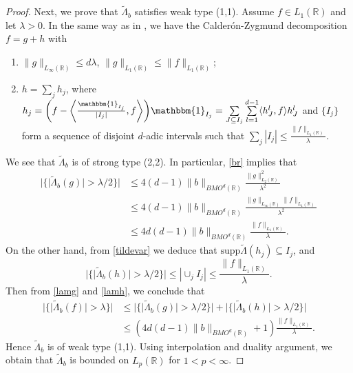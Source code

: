 \documentclass[oneside,english,a4wide]{amsart}
\numberwithin{equation}{section}
\numberwithin{figure}{section}
\theoremstyle{plain}
\theoremstyle{plain}
\theoremstyle{definition}
\theoremstyle{plain}
\theoremstyle{remark}
\theoremstyle{definition}
\theoremstyle{remark}
\theoremstyle{definition}
\newcommand{\8}{\infty}
\begin{document}
\begin{proof}
	Next, we prove that $\tilde{\varLambda}_b$ satisfies weak type (1,1). Assume $f\in L_1(\mathbb{R})$ and let $\lambda>0$. In the same way as in \cite[Lemma 2.7]{Per}, we have the Calder\'{o}n-Zygmund decomposition $f=g+h$ with
	\begin{enumerate}
		\item $\|g\|_{L_\infty(\mathbb{R})}\le d\lambda$, $\|g\|_{L_1(\mathbb{R})}\le \|f\|_{L_1(\mathbb{R})}$;
		\item $h=\sum\limits_{j}h_j$, where $h_j=\bigg(f-\biggl\langle \frac{\mathbbm{1}_{I_j}}{|I_j|},f\biggr\rangle\bigg)\mathbbm{1}_{I_j}=\sum\limits_{J\subseteq I_j}\sum\limits_{l=1}^{d-1}\langle h_J^l,f\rangle h_J^l$ and $\{I_j\}$ form a sequence of disjoint $d$-adic intervals such that $\sum\limits_{j}|I_j|\le \frac{\|f\|_{L_1(\mathbb{R})}}{\lambda}$.
	\end{enumerate}
	We see that $\tilde{\varLambda}_b$ is of strong type (2,2). In particular, \eqref{br} implies that
	\begin{equation}\label{lamg}
		\begin{aligned}
			|\{|\tilde\varLambda_b(g)|>\lambda/2\}|{}&\le 4(d-1)\|b\|_{BMO^d(\mathbb{R})} \frac{\|g\|_{L_2(\mathbb{R})}^2}{\lambda^2}\\
			&\le 4(d-1)\|b\|_{BMO^d(\mathbb{R})} \frac{\|g\|_{L_\infty(\mathbb{R})}\|f\|_{L_1(\mathbb{R})}}{\lambda^2}\\
			&\le 4d(d-1)\|b\|_{BMO^d(\mathbb{R})}\frac{\|f\|_{L_1(\mathbb{R})}}{\lambda}.
		\end{aligned}
	\end{equation}
	On the other hand, from \eqref{tildevar} we deduce that $\mathrm{supp} \tilde{\varLambda}(h_j)\subseteq I_j$, and
	\begin{equation}\label{lamh}
		|\{|\tilde{\varLambda}_b(h)|>\lambda/2\}|\le |\cup_jI_j|\le \frac{\|f\|_{L_1(\mathbb{R})}}{\lambda}.
	\end{equation}
	Then from \eqref{lamg} and \eqref{lamh}, we conclude that
	\begin{equation*}
		\begin{aligned}
			|\{|\tilde{\varLambda}_b(f)|>\lambda\}|{}&\le |\{|\tilde{\varLambda}_b(g)|>\lambda/2\}|+|\{|\tilde{\varLambda}_b(h)|>\lambda/2\}| \\
			&\le (4d(d-1)\|b\|_{BMO^d(\mathbb{R})}+1)\frac{\|f\|_{L_1(\mathbb{R})}}{\lambda}.
		\end{aligned}
	\end{equation*}
	Hence $\tilde{\varLambda}_b$ is of weak type (1,1). Using interpolation and duality argument, we obtain that $\tilde{\varLambda}_b$ is bounded on $ L_p(\mathbb{R})$ for $1<p<\8$.
\end{proof}
\end{document}
